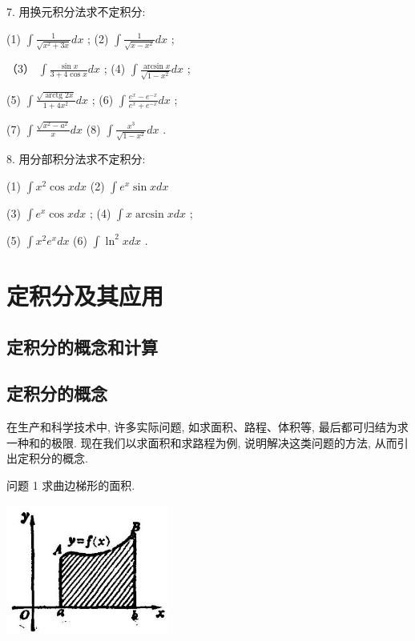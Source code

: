 \documentclass[lang=cn,newtx,12pt,scheme=chinese]{elegantbook}
\begin{document}
7. 用换元积分法求不定积分:

(1) \(\int \frac{1}{\sqrt{{x}^{2} + {3x}}}{dx}\) ; (2) \(\int \frac{1}{\sqrt{x - {x}^{2}}}{dx}\) ;

（3） \(\int \frac{\sin x}{3 + 4\cos x}{dx}\) ; (4) \(\int \frac{\arcsin x}{\sqrt{1 - {x}^{2}}}{dx}\) ;

(5) \(\int \frac{\sqrt{\operatorname{arctg}{2x}}}{1 + 4{x}^{2}}{dx}\) ; (6) \(\int \frac{{e}^{x} - {e}^{-x}}{{e}^{x} + {e}^{-x}}{dx}\) ;

(7) \(\int \frac{\sqrt{{x}^{2} - {a}^{2}}}{x}{dx}\) (8) \(\int \frac{{x}^{3}}{\sqrt{1 - {x}^{2}}}{dx}\) .

8. 用分部积分法求不定积分:

(1) \(\int {x}^{2}\cos {xdx}\) (2) \(\int {e}^{x}\sin {xdx}\)

(3) \(\int {e}^{x}\cos {xdx}\) ; (4) \(\int x\arcsin {xdx}\) ;

(5) \(\int {x}^{2}{e}^{x}{dx}\) (6) \(\int {\ln }^{2}{xdx}\) .

\chapter{定积分及其应用}

\section*{定积分的概念和计算}

\section{定积分的概念}

在生产和科学技术中, 许多实际问题, 如求面积、路程、体积等, 最后都可归结为求一种和的极限. 现在我们以求面积和求路程为例, 说明解决这类问题的方法, 从而引出定积分的概念.

问题 1 求曲边梯形的面积.

\begin{center}
\includegraphics[max width=0.4\textwidth]{images/01912c18-5c3f-733d-b775-749ba9897a9d_216_110266.jpg}
\end{center}
\end{document}
